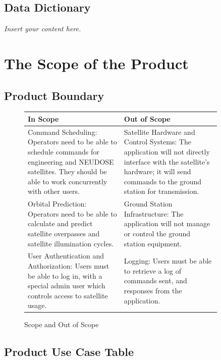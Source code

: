 \documentclass[12pt]{article}
\newcommand{\lips}{\textit{Insert your content here.}}
\begin{document}
\subsection{Data Dictionary}
\lips

\section{The Scope of the Product}
\subsection{Product Boundary}
\begin{figure}[H]
\centering
\caption{Scope and Out of Scope}
\begin{tabular}{|p{0.45\linewidth}|p{0.45\linewidth}|}
\hline
\textbf{In Scope} & \textbf{Out of Scope} \\
\hline
Command Scheduling: Operators need to be able to schedule commands for engineering and NEUDOSE satellites. They should be able to work concurrently with other users. & Satellite Hardware and Control Systems: The application will not directly interface with the satellite’s hardware; it will send commands to the ground station for transmission. \\
\hline
Orbital Prediction: Operators need to be able to calculate and predict satellite overpasses and satellite illumination cycles. & Ground Station Infrastructure: The application will not manage or control the ground station equipment. \\
\hline
User Authentication and Authorization: Users must be able to log in, with a special admin user which controls access to satellite usage. & Logging: Users must be able to retrieve a log of commands sent, and responses from the application. \\
\hline
\end{tabular}
\end{figure}
\subsection{Product Use Case Table}
\end{document}
